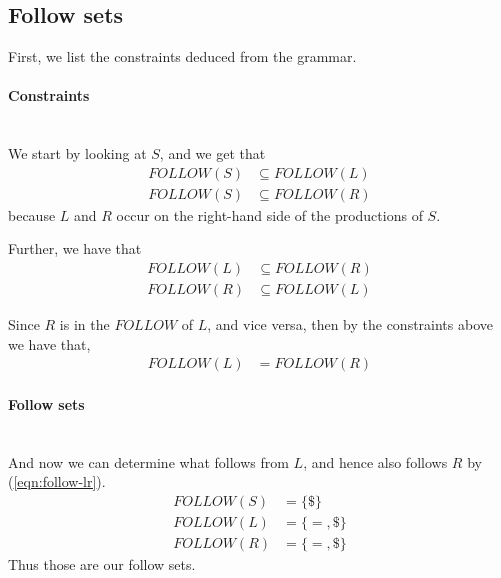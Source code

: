 \subsection{Follow sets}
\begin{multicols}{2}
	
	\noindent
	First, we list the constraints deduced from the grammar.
	\paragraph{Constraints}{\ }\\
	We start by looking at $S$, and we get that
	\begin{align}
		FOLLOW(S) &\subseteq FOLLOW(L) \\
		FOLLOW(S) &\subseteq FOLLOW(R)
	\end{align}
	because $L$ and $R$ occur on the right-hand side of the productions of
	$S$.
	
	Further, we have that
	\begin{align}
		FOLLOW(L) &\subseteq FOLLOW(R) \\
		FOLLOW(R) &\subseteq FOLLOW(L)
	\end{align}
	\vfill
	
	\columnbreak
	
	Since $R$ is in the $FOLLOW$ of $L$, and vice versa, then by the
	constraints above we have that,
	\vspace{-0.15in}
	\begin{align}
		FOLLOW(L) &= FOLLOW(R) \label{eqn:follow-lr}
	\end{align}
	
	\paragraph{Follow sets}{\ }\\
	And now we can determine what follows from $L$, and hence also follows
	$R$ by (\ref{eqn:follow-lr}).
	\vspace{-0.15in}
	\begin{align}
		FOLLOW(S) &= \{\$\} \\
		FOLLOW(L) &= \{=, \$\} \\
		FOLLOW(R) &= \{=, \$\}
	\end{align}
	Thus those are our follow sets.
	\vfill
	
\end{multicols}


